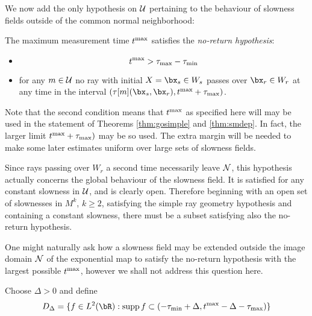 We now add the only hypothesis on ${\cal U}$ pertaining to the
behaviour of slowness fields outside of the common normal
neighborhood:

The maximum measurement time $t^{\rm max}$ satisfies the {\em
  no-return hypothesis}:
\begin{itemize}
\item
\begin{equation}
\label{eqn:tmaxbd}
t^{\rm max} >  \tau_{\rm max}-\tau_{\rm min}
\end{equation}
\item for any $m \in {\cal U}$ no ray with initial $X=\bx_s \in W_s$ passes over $\bx_r \in W_r$
at any time in the interval $(\tau[m](\bx_s,\bx_r), t^{\rm max}+\tau_{\rm max})$.
\end{itemize}
Note that the second condition means that $t^{\rm max}$ as specified 
here will may be used in the statement of Theorems \ref{thm:gosimple}
and \ref{thm:smdep}. In fact, the larger limit $t^{\rm max} +\tau_{\rm max})$ may be so used. The extra margin will be needed to
make some later estimates uniform over large sets of
slowness fields.

Since rays passing over $W_r$ a second time necessarily leave ${\cal
  N}$, this hypothesis actually concerns the global behaviour of the
slowness field. It is satisfied for any constant slowness in ${\cal
  U}$, and is clearly open. Therefore beginning with an open set of
slownesses in $M^k$, $k \ge 2$, satisfying the simple ray geometry
hypothesis and containing a constant slowness, there must be a subset
satisfying also the no-return hypothesis.

One might naturally ask how a slowness field may be
extended outside the image domain ${\cal N}$ of the exponential map to
satisfy the no-return hypothesis with the largest possible $t^{\rm
  max}$, however we shall not address this question here. 

Choose $\Delta > 0$ and define
\begin{equation}
\label{eqn:fwddomdef}
D_{\Delta} = \{f \in L^2(\bR): {\rm supp}\,f \subset (-\tau_{\rm min} +
\Delta, t^{\rm max} -\Delta - \tau_{\rm max})\}
\end{equation}


